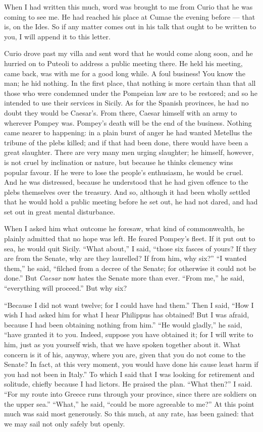  When I had written this much, word was brought to me from Curio that he was coming to see me. He had reached his place at Cumae the evening before --- that is, on the Ides. So if any matter comes out in his talk that ought to be written to you, I will append it to this letter.

 Curio drove past my villa and sent word that he would come along soon, and he hurried on to Puteoli to address a public meeting there. He held his meeting, came back, was with me for a good long while. A foul business! You know the man; he hid nothing. In the first place, that nothing is more certain than that all those who were condemned under the Pompeian law are to be restored; and so he intended to use their services in Sicily. As for the Spanish provinces, he had no doubt they would be Caesar's. From there, Caesar himself with an army to wherever Pompey was. Pompey's death will be the end of \dag{}the business\dag{}. Nothing came nearer to happening: in a plain burst of anger \dag{}he\dag{} had wanted Metellus the tribune of the plebs killed; and if that had been done, there would have been a great slaughter. There are very many men urging slaughter; he himself, however, is not cruel by inclination or nature, but because he thinks clemency wins popular favour. If he were to lose the people's enthusiasm, he would be cruel. And he was distressed, because he understood that he had given offence to the plebs themselves over the treasury. And so, although it had been wholly settled that he would hold a public meeting before he set out, he had not dared, and had set out in great mental disturbance.

 When I asked him what outcome he foresaw, what kind of commonwealth, he plainly admitted that no hope was left. He feared Pompey's fleet. If it put out to sea, he would quit Sicily. ``What about,'' I said, ``those six fasces of yours? If they are from the Senate, why are they laurelled? If from him, why six?'' ``I wanted them,'' he said, ``filched from a decree of the Senate; for otherwise it could not be done.'' But \emph{Caesar} now hates the Senate more than ever. ``From me,'' he said, ``everything will proceed.'' But why six?

 ``Because I did not want twelve; for I could have had them.'' Then I said, ``How I wish I had asked him for what I hear Philippus has obtained! But I was afraid, because I had been obtaining nothing from him.'' ``He would gladly,'' he said, ``have granted it to you. Indeed, suppose you have obtained it; for I will write to him, just as you yourself wish, that we have spoken together about it. What concern is it of his, anyway, where you are, given that you do not come to the Senate? In fact, at this very moment, you would have done his cause least harm if you had not been in Italy.'' To which I said that I was looking for retirement and solitude, chiefly because I had lictors. He praised the plan. ``What then?'' I said. ``For my route into Greece runs through your province, since there are soldiers on the upper sea.'' ``What,'' he said, ``could be more agreeable to me?'' At this point much was said most generously. So this much, at any rate, has been gained: that we may sail not only safely but openly.

